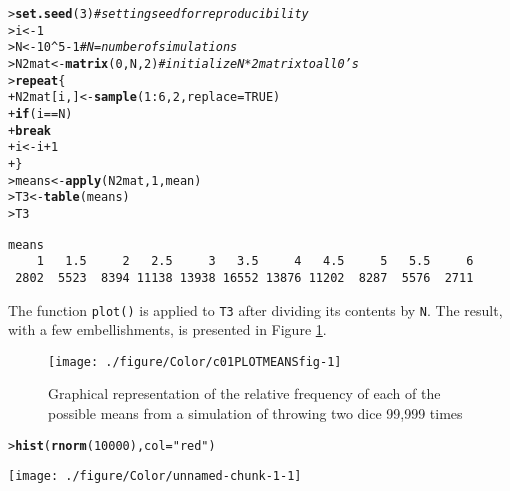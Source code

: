 \documentclass{article}\usepackage[]{graphicx}\usepackage[]{color}
\makeatletter
\def\maxwidth{ %
  \ifdim\Gin@nat@width>\linewidth
    \linewidth
  \else
    \Gin@nat@width
  \fi
}
\newcommand{\hlnum}[1]{\textcolor[rgb]{0.686,0.059,0.569}{#1}}%
\newcommand{\hlstr}[1]{\textcolor[rgb]{0.192,0.494,0.8}{#1}}%
\newcommand{\hlcom}[1]{\textcolor[rgb]{0.678,0.584,0.686}{\textit{#1}}}%
\newcommand{\hlopt}[1]{\textcolor[rgb]{0,0,0}{#1}}%
\newcommand{\hlstd}[1]{\textcolor[rgb]{0.345,0.345,0.345}{#1}}%
\newcommand{\hlkwa}[1]{\textcolor[rgb]{0.161,0.373,0.58}{\textbf{#1}}}%
\newcommand{\hlkwb}[1]{\textcolor[rgb]{0.69,0.353,0.396}{#1}}%
\newcommand{\hlkwc}[1]{\textcolor[rgb]{0.333,0.667,0.333}{#1}}%
\newcommand{\hlkwd}[1]{\textcolor[rgb]{0.737,0.353,0.396}{\textbf{#1}}}%
\newenvironment{kframe}{%
 \def\at@end@of@kframe{}%
 \ifinner\ifhmode%
  \def\at@end@of@kframe{\end{minipage}}%
  \begin{minipage}{\columnwidth}%
 \fi\fi%
 \def\FrameCommand##1{\hskip\@totalleftmargin \hskip-\fboxsep
 \colorbox{shadecolor}{##1}\hskip-\fboxsep
     \hskip-\linewidth \hskip-\@totalleftmargin \hskip\columnwidth}%
 \MakeFramed {\advance\hsize-\width
   \@totalleftmargin\z@ \linewidth\hsize
   \@setminipage}}%
 {\par\unskip\endMakeFramed%
 \at@end@of@kframe}
\newenvironment{knitrout}{}{} %
\makeatother
\begin{document}
\begin{knitrout}
\color{fgcolor}\begin{kframe}
\begin{alltt}
\hlstd{> }\hlkwd{set.seed}\hlstd{(}\hlnum{3}\hlstd{)}  \hlcom{# setting seed for reproducibility}
\hlstd{> }\hlstd{i} \hlkwb{<-} \hlnum{1}
\hlstd{> }\hlstd{N} \hlkwb{<-} \hlnum{10}\hlopt{^}\hlnum{5} \hlopt{-} \hlnum{1}  \hlcom{# N = number of simulations}
\hlstd{> }\hlstd{N2mat} \hlkwb{<-} \hlkwd{matrix}\hlstd{(}\hlnum{0}\hlstd{, N,} \hlnum{2}\hlstd{)}  \hlcom{# initialize N*2 matrix to all 0's}
\hlstd{> }\hlkwa{repeat} \hlstd{\{}
\hlstd{+ }    \hlstd{N2mat[i, ]} \hlkwb{<-} \hlkwd{sample}\hlstd{(}\hlnum{1}\hlopt{:}\hlnum{6}\hlstd{,} \hlnum{2}\hlstd{,} \hlkwc{replace} \hlstd{=} \hlnum{TRUE}\hlstd{)}
\hlstd{+ }    \hlkwa{if} \hlstd{(i} \hlopt{==} \hlstd{N)}
\hlstd{+ }        \hlkwa{break}
\hlstd{+ }    \hlstd{i} \hlkwb{<-} \hlstd{i} \hlopt{+} \hlnum{1}
\hlstd{+ }\hlstd{\}}
\hlstd{> }\hlstd{means} \hlkwb{<-} \hlkwd{apply}\hlstd{(N2mat,} \hlnum{1}\hlstd{, mean)}
\hlstd{> }\hlstd{T3} \hlkwb{<-} \hlkwd{table}\hlstd{(means)}
\hlstd{> }\hlstd{T3}
\end{alltt}
\begin{verbatim}
means
    1   1.5     2   2.5     3   3.5     4   4.5     5   5.5     6 
 2802  5523  8394 11138 13938 16552 13876 11202  8287  5576  2711 
\end{verbatim}
\end{kframe}
\end{knitrout}

The function \texttt{plot()} is applied to \texttt{T3} after dividing its contents by \texttt{N}.  The result, with a few embellishments, is presented in Figure \ref{c01PLOTMEANS}. 


\begin{figure}[!ht]
\centering
\begin{knitrout}
\color{fgcolor}
\texttt{[image: ./figure/Color/c01PLOTMEANSfig-1]} 

\end{knitrout}
\caption{Graphical representation of the relative frequency of each of the possible means from a simulation of throwing two dice 99,999 times \label{c01PLOTMEANS}}
\end{figure}

\begin{knitrout}
\color{fgcolor}\begin{kframe}
\begin{alltt}
\hlstd{> }\hlkwd{hist}\hlstd{(}\hlkwd{rnorm}\hlstd{(}\hlnum{10000}\hlstd{),} \hlkwc{col} \hlstd{=} \hlstr{"red"}\hlstd{)}
\end{alltt}
\end{kframe}
\texttt{[image: ./figure/Color/unnamed-chunk-1-1]} 

\end{knitrout}
\end{document}
